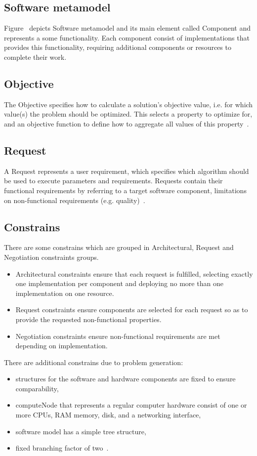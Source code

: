\subsection{Software metamodel}
Figure~\label{SWmodel} depicts Software metamodel and its main element called Component and represents a some functionality.
Each component consist of implementations that provides this functionality, requiring additional components or resources to complete their work. 

\subsection{Objective}
The Objective specifies how to calculate a solution's objective value, i.e. for which value(s) the problem should be optimized. This selects a property to optimize for, and an objective function to define how to aggregate all values of this property~\cite{gotz18}.

\subsection{Request}
A Request represents a user requirement, which specifies which algorithm should be used to execute parameters and requirements. Requests contain their functional requirements by referring to a target software component, limitations on non-functional requirements (e.g. quality)~\cite{gotz18}.

\subsection{Constrains}
There are some constrains which are grouped in Architectural, Request and Negotiation constraints groups.
\begin{itemize}
	\item Architectural constraints ensure that each request is fulfilled, selecting exactly one implementation per component and deploying no more than one implementation on one resource.
	\item Request constraints ensure components are selected for each request so as to provide the requested non-functional properties.
	\item Negotiation constraints ensure non-functional requirements are met depending on implementation.
\end{itemize}
There are additional constrains due to problem generation:
\begin{itemize}
	\item structures for the software and hardware components are fixed to ensure comparability,
	\item computeNode that represents a regular computer hardware consist of one or more CPUs, RAM memory, disk, and a networking interface,
	\item software model has a simple tree structure,
	\item  fixed branching factor of two~\cite{gotz18}.
\end{itemize}


